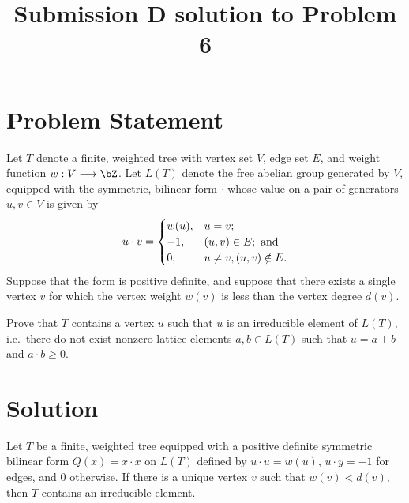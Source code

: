 \title{Submission D solution to Problem 6}
\date{}
\maketitle

\section*{Problem Statement}

Let $T$ denote a finite, weighted tree with vertex set $V$, edge set $E$, and weight function $w : V \longrightarrow \bZ$.
Let $L(T)$ denote the free abelian group generated by $V$, equipped with the symmetric, bilinear form $\cdot$ whose value on a pair of generators $u,v \in V$ is given by 
\[
u \cdot v = 
\begin{cases}
    w(u), & u=v; \\
    -1, & (u,v) \in E; \textup{ and} \\
    0, & u \ne v, (u,v) \notin E.
\end{cases}
\]
Suppose that the form is positive definite, and suppose that there exists a single vertex $v$ for which the vertex weight $w(v)$ is less than the vertex degree $d(v)$.

Prove that $T$ contains a vertex $u$ such that $u$ is an irreducible element of $L(T)$, i.e.~there do not exist nonzero lattice elements $a,b \in L(T)$ such that $u = a+b$ and $a \cdot b \ge 0$.

\section*{Solution}

\begin{theorem}
Let $T$ be a finite, weighted tree equipped with a positive definite symmetric bilinear form $Q(x) = x \cdot x$ on $L(T)$ defined by $u \cdot u = w(u)$, $u \cdot y = -1$ for edges, and $0$ otherwise. If there is a unique vertex $v$ such that $w(v) < d(v)$, then $T$ contains an irreducible element.
\end{theorem}

